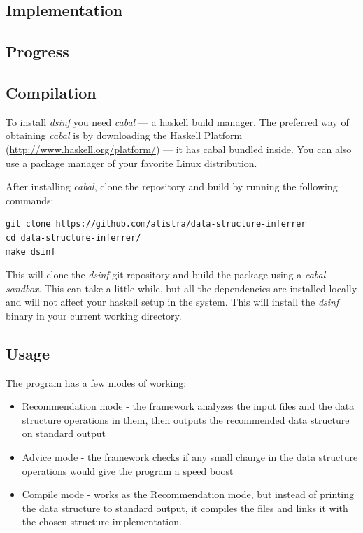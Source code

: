 \documentclass[a4paper,11pt]{article}
\begin{document}
\newpage
\begin{appendices}
\section{Implementation}
	\subsection{Progress}
	\subsection{Compilation}
	To install \emph{dsinf} you need \emph{cabal} --- a haskell build manager. The preferred way of obtaining
	\emph{cabal} is by downloading the Haskell Platform (\href{http://www.haskell.org/platform/}{http://www.haskell.org/platform/})
	--- it has cabal bundled inside. You can also use a package manager of your favorite Linux distribution.
	
	After installing \emph{cabal}, clone the repository and build by running the following commands:
	  	\begin{lstlisting}
git clone https://github.com/alistra/data-structure-inferrer
cd data-structure-inferrer/
make dsinf
		\end{lstlisting}
	This will clone the \emph{dsinf} git repository and build the package using a \emph{cabal sandbox}.
	This can take a little while, but all the dependencies are installed locally and will not affect your 
	haskell setup in the system. This will install the \emph{dsinf} binary in your current working directory.
	\subsection{Usage}

	The program has a few modes of working:
	\begin{itemize}
		\item Recommendation mode - the framework analyzes the input files and the data structure operations in
			them, then outputs the recommended data structure on standard output
		\item Advice mode - the framework checks if any small change in the data structure operations would give
			the program a speed boost
		\item Compile mode - works as the Recommendation mode, but instead of printing the data structure to
			standard output, it compiles the files and links it with the chosen structure implementation.
	\end{itemize}
	

\end{appendices}
\end{document}
